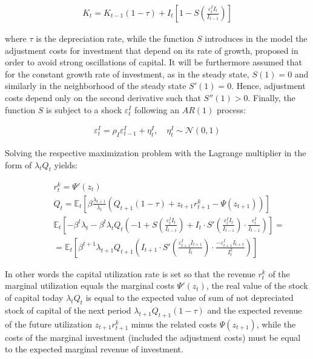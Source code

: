 \documentclass{pracamgr}
\numberwithin{equation}{section}
\begin{document}
\begin{align}
K_{t} = K_{t-1} (1 - \tau) + I_{t} \left[ 1 - S \left(\frac{\varepsilon_{t}^{I}I_{t}}{I_{t-1}} \right) \right]
\end{align}

where $\tau$ is the depreciation rate, while the function $S$ introduces in the model the adjustment costs for investment that depend on its rate of growth, proposed in order to avoid strong oscillations of capital. It will be  furthermore assumed that for the constant growth rate of investment, as in the steady state, $S(1)=0$ and similarly in the neighborhood of the steady state $S'(1) = 0$. Hence, adjustment costs depend only on the second derivative such that $S''(1)>0$. Finally, the function $S$ is subject to a shock $\varepsilon_{t}^{I}$ following an $AR(1)$ process:

\begin{align}
\varepsilon_{t}^{I} = \rho_{I} \varepsilon_{t-1}^{I} + \eta_{t}^{I}, \quad  \eta_{t}^{I} \sim \mathcal{N} \left(0,1\right)
\end{align}

Solving the respective maximization problem with the Lagrange multiplier in the form of $\lambda_{t} Q_{t}$ yields:

\begin{align}
&r_{t}^{k} = \Psi'(z_{t})  \\
&Q_{t} = \mathbb{E}_{t} \left[ \beta \frac{\lambda_{t+1}}{\lambda_{t}} \left( Q_{t+1}(1-\tau) + z_{t+1}r_{t+1}^{k} - \Psi(z_{t+1}) \right) \right]  \\
&\mathbb{E}_{t} \left[ -\beta^{t} \lambda_{t} - \beta^{t} \lambda_{t} Q_{t} \left(-1 + S\left(\frac{\varepsilon_{t}^{I}I_{t}}{I_{t-1}} \right) + I_{t} \cdot S' \left(\frac{\varepsilon_{t}^{I}I_{t}}{I_{t-1}} \right) \cdot \frac{\varepsilon_{t}^{I}}{I_{t-1}} \right) \right] = \nonumber \\
\qquad &= \mathbb{E}_{t} \left[ \beta^{t+1} \lambda_{t+1} Q_{t+1} \left(I_{t+1} \cdot S' \left(\frac{\varepsilon_{t+1}^{I}I_{t+1}}{I_{t}} \right) \cdot \frac{-\varepsilon_{t+1}^{I} I_{t+1}}{I_{t}^{2}} \right) \right]
\end{align}

In other words the capital utilization rate is set so that the revenue $r_{t}^{k}$ of the marginal utilization equals the marginal costs $\Psi'(z_{t})$, the real value of the stock of capital today $\lambda_{t} Q_{t}$ is equal to the expected value of sum of not depreciated stock of capital of the next period $\lambda_{t+1}Q_{t+1}(1-\tau)$ and the expected revenue of the future utilization $ z_{t+1}r_{t+1}^{k}$ minus the related costs $\Psi(z_{t+1})$, while the costs of the marginal investment (included the adjustment costs) must be equal to the expected marginal revenue of investment.
\end{document}
